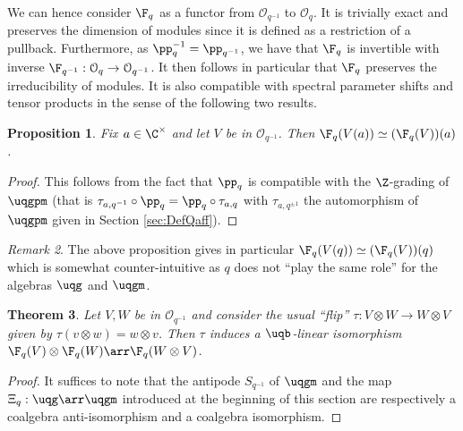 \documentclass[11pt]{amsart}
\newtheorem{theorem}{Theorem}[section]
\newtheorem{prop}[theorem]{Proposition}
\theoremstyle{definition}
\theoremstyle{remark}
\newtheorem{rem}[theorem]{Remark}
\numberwithin{equation}{section}
\begin{document}
We can hence consider $\F_q$ as a functor from $\mathcal{O}_{q^{-1}}$ to $\mathcal{O}_q$. It is trivially exact and preserves the dimension of modules since it is defined as a restriction of a pullback. Furthermore, as $\pp_q^{-1} = \pp_{q^{-1}}$, we have that $\F_q$ is invertible with inverse $\F_{q^{-1}}:\mathcal{O}_q\rightarrow \mathcal{O}_{q^{-1}}$. It then follows in particular that $\F_q$ preserves the irreducibility of modules. It is also compatible with spectral parameter shifts and tensor products in the sense of the following two results.\newpage
\begin{prop}\label{prop:Fshift} Fix $a\in \C^{\times}$ and let $V$ be in $\mathcal{O}_{q^{-1}}$. Then  $\F_q(V(a)) \simeq (\F_q(V))(a)$. 
\end{prop}
\begin{proof}
This follows from the fact that $\pp_q$ is compatible with the $\Z$-grading of $\uqgpm$ (that is $\tau_{a,q^{-1}}\circ \pp_q = \pp_q\circ \tau_{a,q}$ with $\tau_{a,q^{\pm 1}}$ the automorphism of $\uqgpm$ given in Section \ref{sec:DefQaff}).
\end{proof}
\begin{rem} The above proposition gives in particular $\F_q(V(q)) \simeq (\F_q(V))(q)$ which is somewhat counter-intuitive as $q$ does not ``play the same role'' for the algebras $\uqg$ and $\uqgm$.
\end{rem}
\begin{theorem}\label{thm:Comon} Let $V,W$ be in $\mathcal{O}_{q^{-1}}$ and consider the usual ``flip'' $\tau : V\otimes W \rightarrow W\otimes V$ given by $\tau(v\otimes w)=w\otimes v$. Then $\tau$ induces a $\uqb$-linear isomorphism $\F_q(V)\otimes \F_q(W)\arr \F_q(W\otimes V)$.
\end{theorem}
\begin{proof} %
It suffices to note that the antipode $S_{q^{-1}}$ of $\uqgm$ and the map $\Xi_q:\uqg\arr\uqgm$ introduced at the beginning of this section are respectively a coalgebra anti-isomorphism and a coalgebra isomorphism.
\end{proof}
\end{document}
